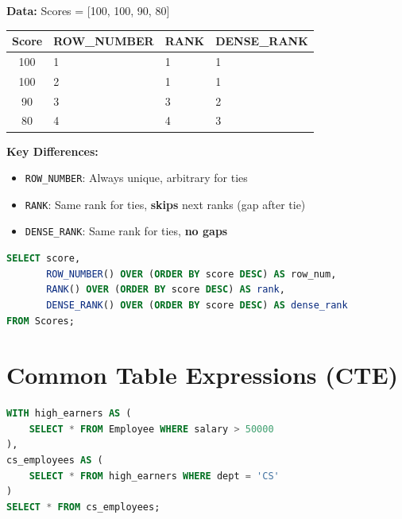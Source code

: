 \begin{examplebox}
\textbf{Data:} Scores = [100, 100, 90, 80]

\begin{center}
\begin{tabular}{clll}
\toprule
\textbf{Score} & \textbf{ROW\_NUMBER} & \textbf{RANK} & \textbf{DENSE\_RANK} \\
\midrule
100 & 1 & 1 & 1 \\
100 & 2 & 1 & 1 \\
90 & 3 & 3 & 2 \\
80 & 4 & 4 & 3 \\
\bottomrule
\end{tabular}
\end{center}

\textbf{Key Differences:}
\begin{itemize}
    \item \texttt{ROW\_NUMBER}: Always unique, arbitrary for ties
    \item \texttt{RANK}: Same rank for ties, \textbf{skips} next ranks (gap after tie)
    \item \texttt{DENSE\_RANK}: Same rank for ties, \textbf{no gaps}
\end{itemize}

\begin{lstlisting}[language=SQL]
SELECT score,
       ROW_NUMBER() OVER (ORDER BY score DESC) AS row_num,
       RANK() OVER (ORDER BY score DESC) AS rank,
       DENSE_RANK() OVER (ORDER BY score DESC) AS dense_rank
FROM Scores;
\end{lstlisting}
\end{examplebox}

\section{Common Table Expressions (CTE)}

\begin{examplebox}
\begin{lstlisting}[language=SQL]
WITH high_earners AS (
    SELECT * FROM Employee WHERE salary > 50000
),
cs_employees AS (
    SELECT * FROM high_earners WHERE dept = 'CS'
)
SELECT * FROM cs_employees;
\end{lstlisting}
\end{examplebox}

